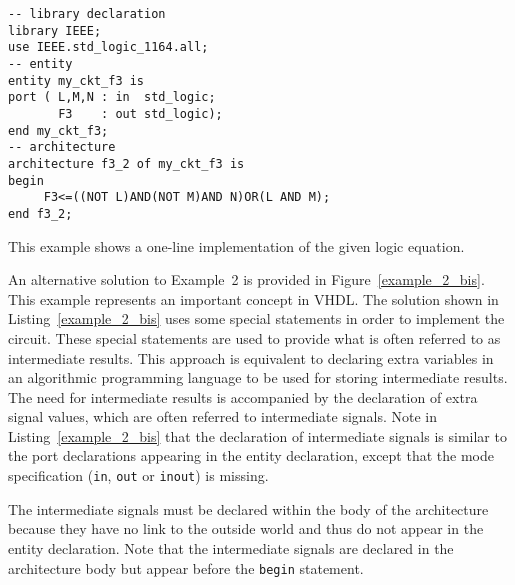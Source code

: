 \noindent
\begin{minipage}{0.57\linewidth}
\begin{lstlisting}[label=example_2, caption=Solution of Example~2.]
-- library declaration
library IEEE;
use IEEE.std_logic_1164.all;
-- entity
entity my_ckt_f3 is
port ( L,M,N : in  std_logic;
       F3    : out std_logic);
end my_ckt_f3;
-- architecture
architecture f3_2 of my_ckt_f3 is
begin
     F3<=((NOT L)AND(NOT M)AND N)OR(L AND M);
end f3_2;
\end{lstlisting}
\end{minipage}
\begin{minipage}{0.4\linewidth}
\begin{flushright}
\end{flushright}
\end{minipage}

This example shows a one-line implementation of the given logic equation.

An alternative solution to Example~2 is provided in Figure~\ref{example_2_bis}. This example represents an important concept in VHDL. The solution shown in Listing~\ref{example_2_bis} uses some special statements in order to implement the circuit. These special statements are used to provide what is often referred to as intermediate results. This approach is equivalent to declaring extra variables in an algorithmic programming language to be used for storing intermediate results. The need for intermediate results is accompanied by the declaration of extra signal values, which are often referred to intermediate signals. Note in Listing~\ref{example_2_bis} that the declaration of intermediate signals is similar to the port declarations appearing in the entity declaration, except that the mode specification (\texttt{in}, \texttt{out} or \texttt{inout}) is missing. 

The intermediate signals must be declared within the body of the architecture because they have no link to the outside world and thus do not appear in the entity declaration. Note that the intermediate signals are declared in the architecture body but appear before the \texttt{begin} statement.

